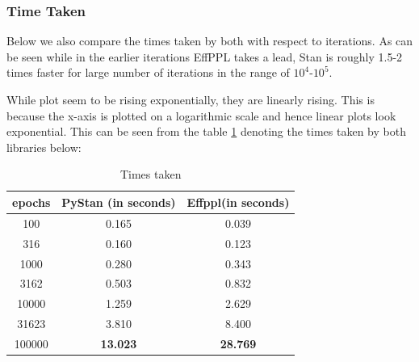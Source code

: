 \documentclass[a4paper,11pt]{article}
\theoremstyle{mytheor}
\begin{document}
        \subsubsection{Time Taken}
        Below we also compare the times taken by both with respect to iterations. As can be seen while in the earlier iterations EffPPL takes a lead, Stan is roughly 1.5-2 times faster for large number of iterations in the range of $10^4$-$10^5$. 
         \begin{center}
            
        \end{center}
        
        While plot seem to be rising exponentially, they are linearly rising. This is because the x-axis is plotted on a logarithmic scale and hence linear plots look exponential. This can be seen from the table \ref{tab:time} denoting the times taken by both libraries below:
        

        \begin{table}[H]\centering
        \begin{tabular}{c|c|c}
        \toprule
        epochs & PyStan (in seconds)   & Effppl(in seconds) \\
        \midrule
        \midrule
        100    & 0.165  & 0.039  \\
        316    & 0.160  & 0.123  \\
        1000   & 0.280  & 0.343  \\
        3162   & 0.503  & 0.832  \\
        10000  & 1.259  & 2.629  \\
        31623  & 3.810  & 8.400 \\
        100000 & \textbf{13.023} & \textbf{28.769} \\
        \bottomrule
        \end{tabular}
        \caption{Times taken}
        \label{tab:time}
        \end{table}
        
\end{document}
